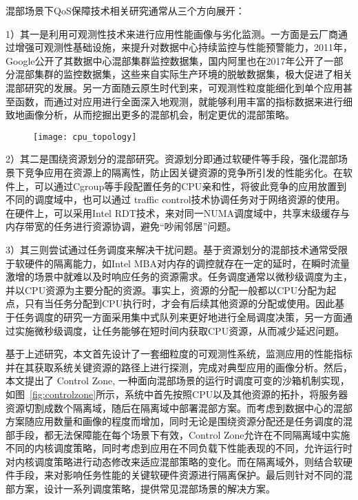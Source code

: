 混部场景下QoS保障技术相关研究通常从三个方向展开：

1）其一是利用可观测性技术来进行应用性能画像与劣化监测。一方面是云厂商通过增强可观测性基础设施，来提升对数据中心持续监控与性能预警能力，2011年，Google公开了其数据中心混部集群监控数据集，国内阿里也在2017年公开了一部分混部集群的监控数据集\citep{guo2019limits}，这些来自实际生产环境的脱敏数据集，极大促进了相关混部研究的发展。另一方面随云原生时代到来，可观测性粒度能细化到单个应用甚至函数，而通过对应用进行全面深入地观测，就能够利用丰富的指标数据来进行细致地画像分析，从而挖掘出更多的混部机会，制定更优的混部策略。

\begin{figure}[!htbp]
    \centering
    \texttt{[image: cpu\_topology]}
    \label{fig:cpu_topology}
\end{figure}

2）其二是围绕资源划分的混部研究。资源划分即通过软硬件等手段，强化混部场景下竞争应用在资源上的隔离性，防止因关键资源的竞争所引发的性能劣化。在软件上，可以通过Cgroup等手段配置任务的CPU亲和性，将彼此竞争的应用放置到不同的调度域中，也可以通过 traffic control技术\citep{hubert2002linux}协调任务对于网络资源的使用。在硬件上，可以采用Intel RDT技术\citep{guide2011intel}，来对同一NUMA调度域中，共享末级缓存与内存带宽的任务进行资源协调，避免“吵闹邻居”问题\citep{xu2018dcat, maricq2018taming, rzadca2020autopilot, kwon2020dc}。

3）其三则尝试通过任务调度来解决干扰问题。基于资源划分的混部技术通常受限于软硬件的隔离能力，如Intel MBA对内存的调控就存在一定的延时\citep{herdrich2016cache}，在瞬时流量激增的场景中就难以及时响应任务的资源需求。任务调度通常以微秒级调度为主，并以CPU资源为主要分配的资源。事实上，资源的分配一般都以CPU分配为起点，只有当任务分配到CPU执行时，才会有后续其他资源的分配或使用。因此基于任务调度的研究一方面采用集中式队列来更好地进行全局调度决策，另一方面通过实施微秒级调度，让任务能够在短时间内获取CPU资源，从而减少延迟问题。

基于上述研究，本文首先设计了一套细粒度的可观测性系统，监测应用的性能指标并在其获取系统关键资源的路径上进行探测，完成对典型应用的画像分析。然后，本文提出了 Control Zone, 一种面向混部场景的运行时调度可变的沙箱机制实现，如图~\ref{fig:controlzone}所示，系统中首先按照CPU以及其他资源的拓扑，将服务器资源切割成数个隔离域，随后在隔离域中部署混部方案。而考虑到数据中心的混部方案随应用数量和画像的程度而增加，同时无论是围绕资源分配还是任务调度的混部手段，都无法保障能在每个场景下有效，Control Zone允许在不同隔离域中实施不同的内核调度策略，同时考虑到应用在不同负载下性能表现的不同，允许运行时对内核调度策略进行动态修改来适应混部策略的变化。而在隔离域外，则结合软硬件手段，来对影响任务性能的关键软硬件资源进行隔离保护。最后则针对不同的混部方案，设计一系列调度策略，提供常见混部场景的解决方案。

